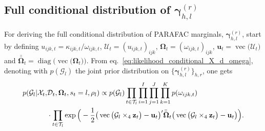 \documentclass[12pt,a4paper]{article}
\DeclareMathOperator*{\vect}{vec}		%
\newcommand*\vecc[1]{\vect\big(#1\big)}
\DeclareMathOperator*{\diagg}{diag}		%
\newcommand*\diag[1]{\diagg\big(#1\big)}
\theoremstyle{custom}
\begin{document}
\subsection{Full conditional distribution of $\boldsymbol{\gamma}_{h,l}^{(r)}$} \label{sec:posterior_gamma_hlr}
For deriving the full conditional distribution of PARAFAC marginals, $\boldsymbol{\gamma}_{h,l}^{(r)}$, start by defining $u_{ijk,t} = \kappa_{ijk,t}/\omega_{ijk,t}$, $\mathcal{U}_t = (u_{ijk,t})_{ijk}$, $\boldsymbol{\Omega}_t = (\omega_{ijk,t})_{ijk}$, $\mathbf{u}_t = \vecc{\mathcal{U}_t}$ and $\bar{\bar{\boldsymbol{\Omega}}}_t = \diag{\vecc{\boldsymbol{\Omega}_t}}$. From eq.~\eqref{eq:likelihood_conditional_X_d_omega}, denoting with $p(\mathcal{G}_l)$ the joint prior distribution on $\lbrace \boldsymbol{\gamma}_{h,l}^{(r)} \rbrace_{h,r}$, one gets
\begin{align}
\notag
p(\mathcal{G}_l | \mathcal{X}_t, & \mathcal{D}_t,\boldsymbol{\Omega}_t, s_t=l, \rho_l) \propto p(\mathcal{G}_l) \prod_{t\in\mathcal{T}_l} \prod_{i=1}^I \prod_{j=1}^J \prod_{k=1}^K p(\omega_{ijk,t}) \\
 & \cdot \prod_{t\in\mathcal{T}_l} \exp\Big( -\frac{1}{2} \big( \vecc{\mathcal{G}_l \times_4 \mathbf{z}_t} -\mathbf{u}_t \big)' \bar{\bar{\boldsymbol{\Omega}}}_t \big( \vecc{\mathcal{G}_l \times_4 \mathbf{z}_t} -\mathbf{u}_t \big) \Big).
\label{eq:apdx_complete_likelihood_part_I_5}
\end{align}
\end{document}
